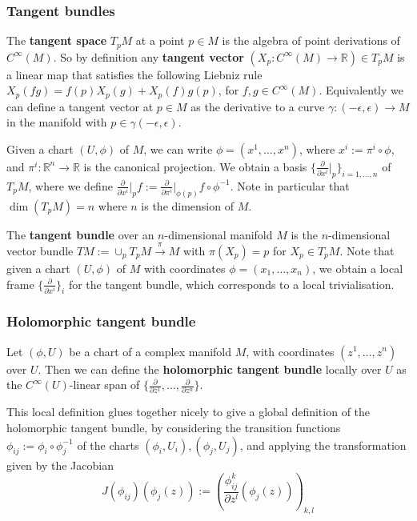 \documentclass[a4paper]{article}
\theoremstyle{definition} \newtheorem*{definition}{Definition}
\theoremstyle{definition} \newtheorem*{definitions}{Definitions}
\theoremstyle{plain} \newtheorem{theorem}{Theorem}[section]
\theoremstyle{plain} \newtheorem{proposition}[theorem]{Proposition}
\theoremstyle{plain} \newtheorem{corollary}[theorem]{Corollary}
\theoremstyle{plain} \newtheorem{lemma}[theorem]{Lemma}
\theoremstyle{plain} \newtheorem{example}[theorem]{Example}
\newcommand{\defn}[1]{\textbf{#1}}
\newcommand{\realnos}{\mathbb{R}}
\newcommand{\smooth}{C^\infty}
\begin{document}
\subsubsection{Tangent bundles}

The \defn{tangent space} $T_p M$ at a point $p\in M$ is the algebra of point derivations of $C^\infty (M)$. So by definition any \defn{tangent vector} $(X_p:C^\infty (M)\to \realnos) \in T_p M$ is a linear map that satisfies the following Liebniz rule $X_p(fg)=f(p)X_p(g) + X_p(f)g(p)$, for $f,g\in C^\infty (M)$. Equivalently we can define a tangent vector at $p\in M$ as the derivative to a curve $\gamma: (-\epsilon, \epsilon)\to M$ in the manifold with $p\in \gamma (-\epsilon, \epsilon)$. 

Given a chart $(U, \phi)$ of $M$, we can write $\phi = (x^1, \ldots, x^n)$, where $x^i := \pi^i\circ \phi$, and $\pi^i:\realnos^n \to \realnos$ is the canonical projection. We obtain a basis $\{\frac{\partial}{\partial{x^i}} \vert_p\}_{i=1,\ldots, n}$ 
of $T_p M$, where we define $\frac{\partial}{\partial{x^i}} \vert_p f := \frac{\partial}{\partial{\pi^i}}\vert_{\phi (p)} f\circ \phi^{-1}$. Note in particular that 
$\dim (T_p M) = n$ where 
$n$ is the dimension of $M$.

The \defn{tangent bundle} over an $n$-dimensional manifold $M$ is the $n$-dimensional vector bundle $TM:=\cup_p T_p M\xrightarrow{\pi} M$ with $\pi(X_p)=p$ for $X_p\in T_p M$. Note that given a chart $(U, \phi)$ of $M$ with coordinates $\phi =(x_1, \ldots, x_n)$, we obtain a local frame $\{\frac{\partial}{\partial{x^i}}\}_i$ for the tangent bundle, which corresponds to a local trivialisation. 

\subsubsection{Holomorphic tangent bundle}
Let $(\phi, U)$ be a chart of a complex manifold $M$, with coordinates $(z^1, \ldots, z^n)$ over $U$. Then we can define the \defn{holomorphic tangent bundle} locally over $U$ as the $\smooth(U)$-linear span of $\{ \frac{\partial}{\partial z^1}, \ldots,  \frac{\partial}{\partial z^n}\}$. 

This local definition glues together nicely to give a global definition of the holomorphic tangent bundle, by considering the transition functions $\phi_{ij}:=\phi_i\circ \phi_j^{-1}$ of the charts $(\phi_i, U_i), (\phi_j, U_j)$, and applying the transformation given by the Jacobian
$$J(\phi_{ij})(\phi_j(z)):=\left( \frac{\phi_{ij}^k}{\partial z^l} (\phi_j(z)) \right)_{k, l}$$
\end{document}
